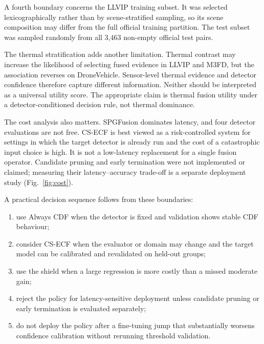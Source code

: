 \documentclass[preprint,11pt]{elsarticle}
\begin{document}
A fourth boundary concerns the LLVIP training subset. It was selected
lexicographically rather than by scene-stratified sampling, so its scene
composition may differ from the full official training partition. The test
subset was sampled randomly from all 3,463 non-empty official test pairs.

The thermal stratification adds another limitation. Thermal contrast may
increase the likelihood of selecting fused evidence in LLVIP and M3FD, but the
association reverses on DroneVehicle. Sensor-level thermal evidence and
detector confidence therefore capture different information. Neither should be
interpreted as a universal utility score. The appropriate claim is thermal
fusion utility under a detector-conditioned decision rule, not thermal dominance.

The cost analysis also matters. SPGFusion dominates latency, and four detector
evaluations are not free. CS-ECF is best viewed as a risk-controlled system for
settings in which the target detector is already run and the cost of a
catastrophic input choice is high. It is not a low-latency replacement for a
single fusion operator. Candidate pruning and early termination were not
implemented or claimed; measuring their latency--accuracy trade-off is a
separate deployment study (Fig.~\ref{fig:cost}).

A practical decision sequence follows from these boundaries:
\begin{enumerate}
  \item use Always CDF when the detector is fixed and validation shows stable
  CDF behaviour;
  \item consider CS-ECF when the evaluator or domain may change and the target
  model can be calibrated and revalidated on held-out groups;
  \item use the shield when a large regression is more costly than a missed
  moderate gain;
  \item reject the policy for latency-sensitive deployment unless candidate
  pruning or early termination is evaluated separately;
  \item do not deploy the policy after a fine-tuning jump that substantially
  worsens confidence calibration without rerunning threshold validation.
\end{enumerate}
\end{document}
